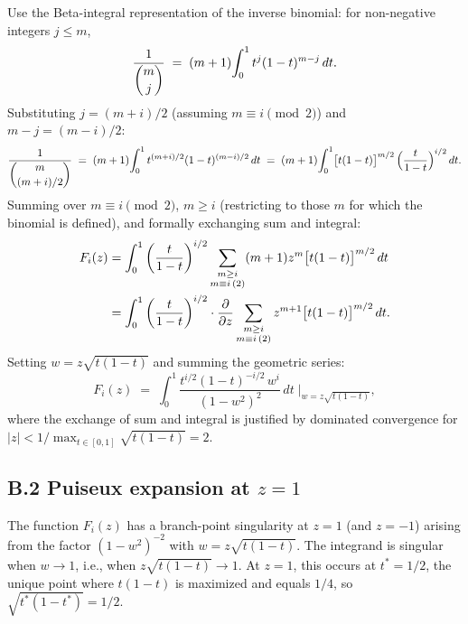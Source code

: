\documentclass[12pt,a4paper]{article}
\theoremstyle{definition}
\renewcommand{\binom}[2]{\dbinom{#1}{#2}}
\begin{document}
Use the Beta-integral representation of the inverse binomial:
for non-negative integers $j\le m$,
\[
\frac{1}{\binom{m}{j}}
\;=\;
(m+1)\!\int_0^1 t^j(1-t)^{m-j}\,dt.
\]
Substituting $j=(m+i)/2$ (assuming $m\equiv i\pmod 2$) and
$m-j=(m-i)/2$:
\[
\frac{1}{\binom{m}{(m+i)/2}}
\;=\;
(m+1)\!\int_0^1 t^{(m+i)/2}(1-t)^{(m-i)/2}\,dt
\;=\;
(m+1)\!\int_0^1 \bigl[t(1-t)\bigr]^{m/2}\,
\Bigl(\frac{t}{1-t}\Bigr)^{i/2}\,dt.
\]
Summing over $m\equiv i\pmod 2$, $m\ge i$ (restricting to those $m$
for which the binomial is defined), and formally exchanging sum and
integral:
\begin{align}
F_i(z)
&= \int_0^1 \left(\frac{t}{1-t}\right)^{i/2}
   \sum_{\substack{m\ge i\\m\equiv i\,(2)}}(m+1)z^m\bigl[t(1-t)\bigr]^{m/2}\,dt
   \notag\\
&= \int_0^1 \left(\frac{t}{1-t}\right)^{i/2}
   \cdot\frac{\partial}{\partial z}
   \sum_{\substack{m\ge i\\m\equiv i\,(2)}}z^{m+1}\bigl[t(1-t)\bigr]^{m/2}\,dt.
   \label{eq:Fiz_integral}
\end{align}
Setting $w=z\sqrt{t(1-t)}$ and summing the geometric series:
\begin{equation}
\label{eq:Fiz_closed}
F_i(z)
\;=\;
\int_0^1
\frac{t^{i/2}(1-t)^{-i/2}\,w^i}{(1-w^2)^2}\,dt
\;\bigg|_{w=z\sqrt{t(1-t)}},
\end{equation}
where the exchange of sum and integral is justified by dominated
convergence for $|z|<1/\max_{t\in[0,1]}\sqrt{t(1-t)}=2$.

\subsection*{B.2 Puiseux expansion at \texorpdfstring{$z=1$}{z=1}}

The function $F_i(z)$ has a branch-point singularity at $z=1$ (and
$z=-1$) arising from the factor $(1-w^2)^{-2}$ with $w=z\sqrt{t(1-t)}$.
The integrand is singular when $w\to 1$, i.e., when
$z\sqrt{t(1-t)}\to 1$.  At $z=1$, this occurs at $t^*=1/2$, the
unique point where $t(1-t)$ is maximized and equals $1/4$, so
$\sqrt{t^*(1-t^*)}=1/2$.
\end{document}
